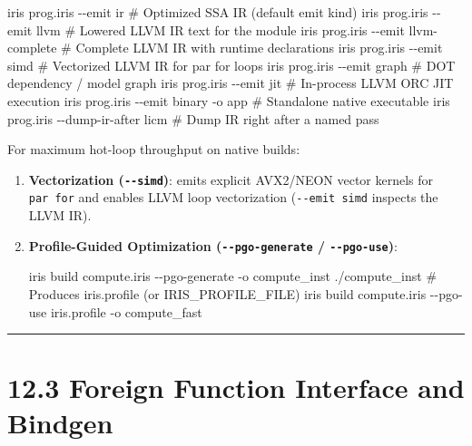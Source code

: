 \documentclass[
  english,
  oneside]{book}
\newenvironment{Shaded}{\begin{snugshade}}{\end{snugshade}}
\newcommand{\NormalTok}[1]{\textcolor[rgb]{0.83,0.83,0.83}{#1}}
\begin{document}
\begin{Shaded}
\begin{Highlighting}[]
\NormalTok{iris prog.iris {-}{-}emit ir              \# Optimized SSA IR (default emit kind)}
\NormalTok{iris prog.iris {-}{-}emit llvm            \# Lowered LLVM IR text for the module}
\NormalTok{iris prog.iris {-}{-}emit llvm{-}complete   \# Complete LLVM IR with runtime declarations}
\NormalTok{iris prog.iris {-}{-}emit simd            \# Vectorized LLVM IR for par for loops}
\NormalTok{iris prog.iris {-}{-}emit graph           \# DOT dependency / model graph}
\NormalTok{iris prog.iris {-}{-}emit jit             \# In{-}process LLVM ORC JIT execution}
\NormalTok{iris prog.iris {-}{-}emit binary {-}o app   \# Standalone native executable}
\NormalTok{iris prog.iris {-}{-}dump{-}ir{-}after licm   \# Dump IR right after a named pass}
\end{Highlighting}
\end{Shaded}

For maximum hot-loop throughput on native builds:

\begin{enumerate}
\def\labelenumi{\arabic{enumi}.}
\item
  \textbf{Vectorization (\texttt{-\/-simd})}: emits explicit AVX2/NEON
  vector kernels for \texttt{par\ for} and enables LLVM loop
  vectorization (\texttt{-\/-emit\ simd} inspects the LLVM IR).
\item
  \textbf{Profile-Guided Optimization (\texttt{-\/-pgo-generate} /
  \texttt{-\/-pgo-use})}:

\begin{Shaded}
\begin{Highlighting}[]
\NormalTok{iris build compute.iris {-}{-}pgo{-}generate {-}o compute\_inst}
\NormalTok{./compute\_inst                    \# Produces iris.profile (or IRIS\_PROFILE\_FILE)}
\NormalTok{iris build compute.iris {-}{-}pgo{-}use iris.profile {-}o compute\_fast}
\end{Highlighting}
\end{Shaded}
\end{enumerate}

\begin{center}\rule{0.5\linewidth}{0.5pt}\end{center}

\section{12.3 Foreign Function Interface and
Bindgen}\label{foreign-function-interface-and-bindgen}
\end{document}
